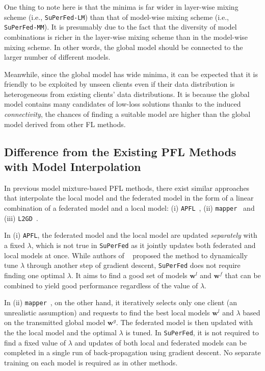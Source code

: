 \documentclass[sigconf]{acmart}
\begin{document}
One thing to note here is that the minima is far wider in layer-wise mixing scheme (i.e., \texttt{SuPerFed-LM}) than that of model-wise mixing scheme (i.e., \texttt{SuPerFed-MM}). It is presumably due to the fact that the diversity of model combinations is richer in the layer-wise mixing scheme than in the model-wise mixing scheme. In other words, the global model should be connected to the larger number of different models. 

Meanwhile, since the global model has wide minima, it can be expected that it is friendly to be exploited by unseen clients even if their data distribution is heterogeneous from existing clients' data distributions. It is because the global model contains many candidates of low-loss solutions thanks to the induced \textit{connectivity}, the chances of finding a suitable model are higher than the global model derived from other FL methods.  

\subsection{Difference from the Existing PFL Methods with Model Interpolation} In previous model mixture-based PFL methods, there exist similar approaches that interpolate the local model and the federated model in the form of a linear combination of a federated model and a local model: (i) \texttt{APFL}~\cite{apfl}, (ii) \texttt{mapper}~\cite{mansour+20} and (iii) \texttt{L2GD}~\cite{l2sgd}.

In (i) \texttt{APFL}, the federated model and the local model are updated \textit{separately} with a fixed $\lambda$, which is not true in \texttt{SuPerFed} as it jointly updates both federated and local models at once. While authors of ~\cite{apfl} proposed the method to dynamically tune $\lambda$ through another step of gradient descent, \texttt{SuPerFed} does not require finding one optimal $\lambda$. It aims to find a good set of models $\mathbf{w}^l$ and $\mathbf{w}^f$ that can be combined to yield good performance regardless of the value of $\lambda$.

In (ii) \texttt{mapper}~\cite{mansour+20}, on the other hand, it iteratively selects only one client (an unrealistic assumption) and requests to find the best local models $\mathbf{w}^l$ and $\lambda$ based on the transmitted global model $\mathbf{w}^g$. The federated model is then updated with the the local model and the optimal $\lambda$ is tuned. In \texttt{SuPerFed}, it is not required to find a fixed value of $\lambda$ and updates of both local and federated models can be completed in a single run of back-propagation using gradient descent. No separate training on each model is required as in other methods. 
\end{document}
